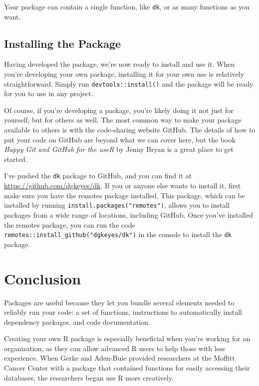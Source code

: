 \documentclass[
]{book}
\begin{document}
Your package can contain a single function, like \texttt{dk}, or as many functions as you want.

\hypertarget{installing-the-package}{%
\subsection*{Installing the Package}\label{installing-the-package}}

Having developed the package, we're now ready to install and use it. When you're developing your own package, installing it for your own use is relatively straightforward. Simply run \texttt{devtools::install()} and the package will be ready for you to use in any project.

Of course, if you're developing a package, you're likely doing it not just for yourself, but for others as well. The most common way to make your package available to others is with the code-sharing website GitHub. The details of how to put your code on GitHub are beyond what we can cover here, but the book \emph{Happy Git and GitHub for the useR} by Jenny Bryan is a great place to get started.

I've pushed the \texttt{dk} package to GitHub, and you can find it at \url{https://github.com/dgkeyes/dk}. If you or anyone else wants to install it, first make sure you have the remotes package installed. This package, which can be installed by running \texttt{install.packages("remotes")}, allows you to install packages from a wide range of locations, including GitHub. Once you've installed the remotes package, you can run the code \texttt{remotes::install\_github("dgkeyes/dk")} in the console to install the \texttt{dk} package.

\hypertarget{conclusion-7}{%
\section*{Conclusion}\label{conclusion-7}}

Packages are useful because they let you bundle several elements needed to reliably run your code: a set of functions, instructions to automatically install dependency packages, and code documentation.

Creating your own R package is especially beneficial when you're working for an organization, as they can allow advanced R users to help those with less experience. When Gerke and Aden-Buie provided researchers at the Moffitt Cancer Center with a package that contained functions for easily accessing their databases, the researchers began use R more creatively.
\end{document}
